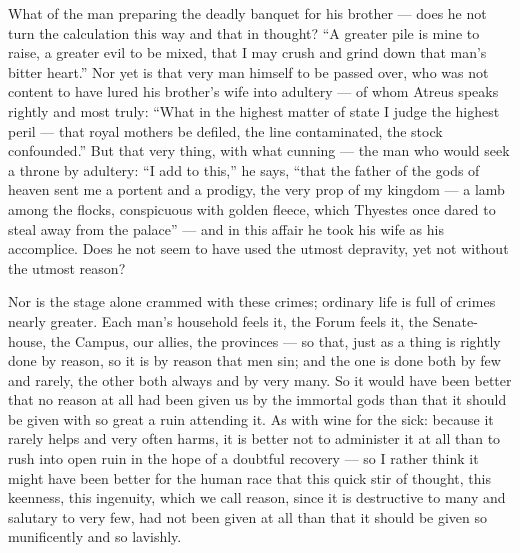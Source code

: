  What of the man preparing the deadly banquet for his brother — does he not turn the calculation this way and that in thought? ``A greater pile is mine to raise, a greater evil to be mixed, that I may crush and grind down that man's bitter heart.'' Nor yet is that very man himself to be passed over, who was not content to have lured his brother's wife into adultery — of whom Atreus speaks rightly and most truly: ``What in the highest matter of state I judge the highest peril — that royal mothers be defiled, the line contaminated, the stock confounded.'' But that very thing, with what cunning — the man who would seek a throne by adultery: ``I add to this,'' he says, ``that the father of the gods of heaven sent me a portent and a prodigy, the very prop of my kingdom — a lamb among the flocks, conspicuous with golden fleece, which Thyestes once dared to steal away from the palace'' — and in this affair he took his wife as his accomplice. Does he not seem to have used the utmost depravity, yet not without the utmost reason?

 Nor is the stage alone crammed with these crimes; ordinary life is full of crimes nearly greater. Each man's household feels it, the Forum feels it, the Senate-house, the Campus, our allies, the provinces — so that, just as a thing is rightly done by reason, so it is by reason that men sin; and the one is done both by few and rarely, the other both always and by very many. So it would have been better that no reason at all had been given us by the immortal gods than that it should be given with so great a ruin attending it. As with wine for the sick: because it rarely helps and very often harms, it is better not to administer it at all than to rush into open ruin in the hope of a doubtful recovery — so I rather think it might have been better for the human race that this quick stir of thought, this keenness, this ingenuity, which we call reason, since it is destructive to many and salutary to very few, had not been given at all than that it should be given so munificently and so lavishly.

